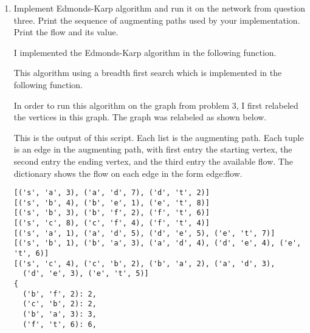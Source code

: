 \documentclass[11pt, oneside]{article}
\begin{document}
\begin{enumerate}
  \item %
    Implement Edmonds-Karp algorithm and run it on the network from question three.
    Print the sequence of augmenting paths used by your implementation.
    Print the flow and its value.

    I implemented the Edmonds-Karp algorithm in the following function.
    

    This algorithm using a breadth first search which is implemented in the
    following function.
    

    In order to run this algorithm on the graph from problem 3, I first
    relabeled the vertices in this graph.
    The graph was relabeled as shown below.
    \begin{center}
    \end{center}
    
    This is the output of this script.
    Each list is the augmenting path.
    Each tuple is an edge in the augmenting path, with first entry the starting
    vertex, the second entry the ending vertex, and the third entry the
    available flow.
    The dictionary shows the flow on each edge in the form edge:flow.
    \begin{verbatim}
[('s', 'a', 3), ('a', 'd', 7), ('d', 't', 2)]
[('s', 'b', 4), ('b', 'e', 1), ('e', 't', 8)]
[('s', 'b', 3), ('b', 'f', 2), ('f', 't', 6)]
[('s', 'c', 8), ('c', 'f', 4), ('f', 't', 4)]
[('s', 'a', 1), ('a', 'd', 5), ('d', 'e', 5), ('e', 't', 7)]
[('s', 'b', 1), ('b', 'a', 3), ('a', 'd', 4), ('d', 'e', 4), ('e', 't', 6)]
[('s', 'c', 4), ('c', 'b', 2), ('b', 'a', 2), ('a', 'd', 3),
  ('d', 'e', 3), ('e', 't', 5)]
{
  ('b', 'f', 2): 2,
  ('c', 'b', 2): 2,
  ('b', 'a', 3): 3,
  ('f', 't', 6): 6,

\end{verbatim}
\end{enumerate}
\end{document}
